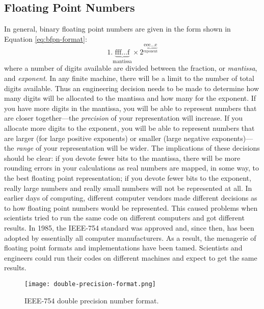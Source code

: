 \subsection{Floating Point Numbers}
In general, binary floating point numbers are given in the form shown in Equation \ref{eq:bfpn-format}:
\begin{equation}
1.\underbrace{\text{fff}\dots\text{f}}_{\text{mantissa}} \times 2^{\underbrace{\text{eee}\dots\text{e}}_{\text{exponent}}}
\label{eq:bfpn-format}
\end{equation}
where a number of digits available are divided between the fraction, or \emph{mantissa}, and \emph{exponent}.  In any finite machine, there will be a limit to the number of total digits available.  Thus an engineering decision needs to be made to determine how many digits will be allocated to the mantissa and how many for the exponent.  If you have more digits in the mantissa, you will be able to represent numbers that are closer together---the \emph{precision} of your representation will increase.  If you allocate more digits to the exponent, you will be able to represent numbers that are larger (for large positive exponents) or smaller (large negative exponents)---the \emph{range} of your representation will be wider.  The implications of these decisions should be clear: if you devote fewer bits to the mantissa, there will be more rounding errors in your calculations as real numbers are mapped, in some way, to the best floating point representation; if you devote fewer bits to the exponent, really large numbers and really small numbers will not be represented at all.  In earlier days of computing, different computer vendors made different decisions as to how floating point numbers would be represented.\cite{moler_fp1}  This caused problems when scientists tried to run the same code on different computers and got different results.  In 1985, the IEEE-754 standard was approved and, since then, has been adopted by essentially all computer manufacturers.  As a result, the menagerie of floating point formats and implementations have been tamed. Scientists and engineers could run their codes on different machines and expect to get the same results.

\begin{figure}
\texttt{[image: double-precision-format.png]}
\caption{IEEE-754 double precision number format.}
\label{fig:double-precision-format}
\end{figure}

